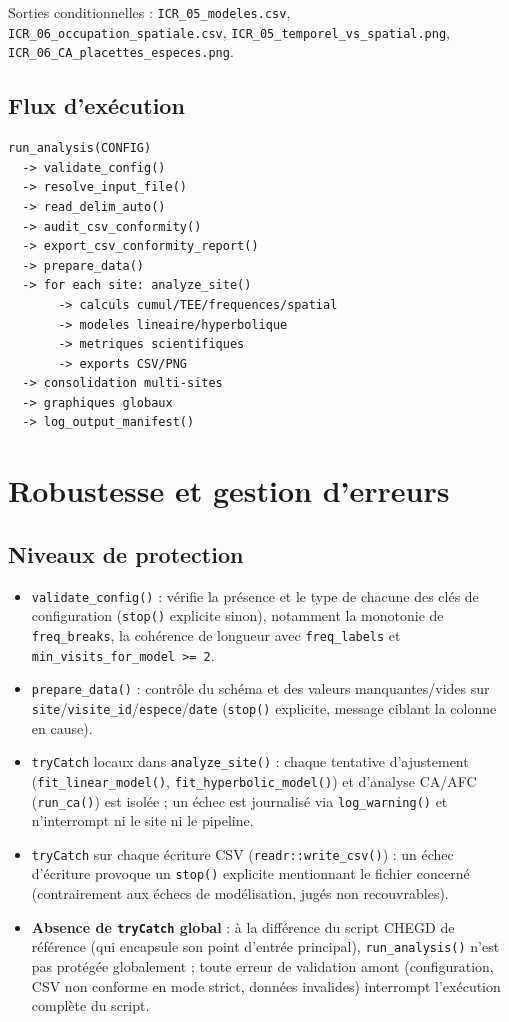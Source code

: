 \documentclass[11pt,a4paper]{article}
\begin{document}
Sorties conditionnelles : \texttt{ICR\_05\_modeles.csv}, \texttt{ICR\_06\_occupation\_spatiale.csv}, \texttt{ICR\_05\_temporel\_vs\_spatial.png}, \texttt{ICR\_06\_CA\_placettes\_especes.png}.

\subsection{Flux d'exécution}
\begin{verbatim}
run_analysis(CONFIG)
  -> validate_config()
  -> resolve_input_file()
  -> read_delim_auto()
  -> audit_csv_conformity()
  -> export_csv_conformity_report()
  -> prepare_data()
  -> for each site: analyze_site()
       -> calculs cumul/TEE/frequences/spatial
       -> modeles lineaire/hyperbolique
       -> metriques scientifiques
       -> exports CSV/PNG
  -> consolidation multi-sites
  -> graphiques globaux
  -> log_output_manifest()
\end{verbatim}

\section{Robustesse et gestion d'erreurs}
\label{sec:robustesse}

\subsection{Niveaux de protection}
\begin{itemize}[leftmargin=1.2cm]
  \item \texttt{validate\_config()} : vérifie la présence et le type de chacune des clés de configuration (\texttt{stop()} explicite sinon), notamment la monotonie de \texttt{freq\_breaks}, la cohérence de longueur avec \texttt{freq\_labels} et \texttt{min\_visits\_for\_model >= 2}.
  \item \texttt{prepare\_data()} : contrôle du schéma et des valeurs manquantes/vides sur \texttt{site}/\texttt{visite\_id}/\texttt{espece}/\texttt{date} (\texttt{stop()} explicite, message ciblant la colonne en cause).
  \item \texttt{tryCatch} locaux dans \texttt{analyze\_site()} : chaque tentative d'ajustement (\texttt{fit\_linear\_model()}, \texttt{fit\_hyperbolic\_model()}) et d'analyse CA/AFC (\texttt{run\_ca()}) est isolée ; un échec est journalisé via \texttt{log\_warning()} et n'interrompt ni le site ni le pipeline.
  \item \texttt{tryCatch} sur chaque écriture CSV (\texttt{readr::write\_csv()}) : un échec d'écriture provoque un \texttt{stop()} explicite mentionnant le fichier concerné (contrairement aux échecs de modélisation, jugés non recouvrables).
  \item \textbf{Absence de \texttt{tryCatch} global} : à la différence du script CHEGD de référence (qui encapsule son point d'entrée principal), \texttt{run\_analysis()} n'est pas protégée globalement ; toute erreur de validation amont (configuration, CSV non conforme en mode strict, données invalides) interrompt l'exécution complète du script.
\end{itemize}
\end{document}
